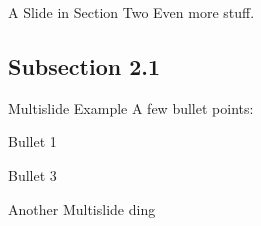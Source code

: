 \documentclass[12pt,screen]{talk}
\begin{document}
\begin{slide}{A Slide in Section Two}
  Even more stuff.
\end{slide}

\subsection{Subsection 2.1}
\begin{multislide}{3}{Multislide Example}
  A few bullet points:
  \begin{itemize}
  \item Bullet 1%
  {\item Bullet 3}
  \end{itemize}
\end{multislide}

\begin{multislide}{2}{Another Multislide}
  ding 
\end{multislide}
\end{document}
